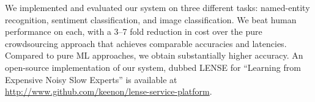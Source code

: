 We implemented and evaluated our system on three different tasks: named-entity
recognition, sentiment classification, and image classification.
We beat human performance on each, 
with a 3--7 fold reduction in cost over the pure crowdsourcing approach 
that achieves comparable accuracies and latencies.
Compared to pure ML approaches, we obtain substantially higher accuracy.
An open-source implementation of our system, dubbed LENSE for ``Learning from Expensive Noisy Slow Experts'' is available at
\href{http://www.github.com/keenon/lense-service-platform}{http://www.github.com/keenon/lense-service-platform}.


% 
